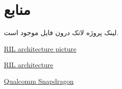 \section{منابع}

لینک پروژه لاتک درون فایل
موجود است.

\vspace{1cm}
\small

\begin{latin}
    \href{https://wladimir-tm4pda.github.io/porting/images/telephony.gif}{RIL architecture picture}
    \newline
    
    \href{https://www.e-consystems.com/Articles/Android/Android-RIL-Architecture.asp}{RIL architecture}
    \newline
    
    \href{https://en.wikipedia.org/wiki/Qualcomm_Snapdragon}{Qualcomm Snapdragon}
    \newline
\end{latin}
